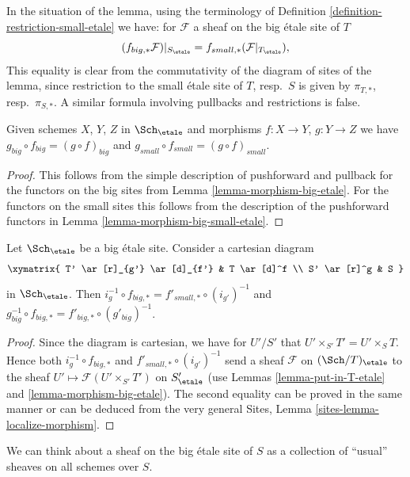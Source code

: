 \noindent
In the situation of the lemma, using the terminology of
Definition \ref{definition-restriction-small-etale}
we have: for $\mathcal{F}$ a sheaf on the big \'etale site of $T$
$$
(f_{big, *}\mathcal{F})|_{S_\etale} =
f_{small, *}(\mathcal{F}|_{T_\etale}),
$$
This equality is clear from the commutativity of the diagram of
sites of the lemma, since restriction to the small \'etale site of
$T$, resp.\ $S$ is given by $\pi_{T, *}$, resp.\ $\pi_{S, *}$. A similar
formula involving pullbacks and restrictions is false.

\begin{lemma}
\label{lemma-composition-etale}
Given schemes $X$, $Y$, $Z$ in $\Sch_\etale$
and morphisms $f : X \to Y$, $g : Y \to Z$ we have
$g_{big} \circ f_{big} = (g \circ f)_{big}$ and
$g_{small} \circ f_{small} = (g \circ f)_{small}$.
\end{lemma}

\begin{proof}
This follows from the simple description of pushforward
and pullback for the functors on the big sites from
Lemma \ref{lemma-morphism-big-etale}. For the functors
on the small sites this follows from the description of
the pushforward functors in Lemma \ref{lemma-morphism-big-small-etale}.
\end{proof}

\begin{lemma}
\label{lemma-morphism-big-small-cartesian-diagram-etale}
Let $\Sch_\etale$ be a big \'etale site. Consider a cartesian diagram
$$
\xymatrix{
T' \ar[r]_{g'} \ar[d]_{f'} & T \ar[d]^f \\
S' \ar[r]^g & S
}
$$
in $\Sch_\etale$. Then
$i_g^{-1} \circ f_{big, *} = f'_{small, *} \circ (i_{g'})^{-1}$
and $g_{big}^{-1} \circ f_{big, *} = f'_{big, *} \circ (g'_{big})^{-1}$.
\end{lemma}

\begin{proof}
Since the diagram is cartesian, we have for $U'/S'$
that $U' \times_{S'} T' = U' \times_S T$. Hence both
$i_g^{-1} \circ f_{big, *}$ and $f'_{small, *} \circ (i_{g'})^{-1}$
send a sheaf $\mathcal{F}$ on $(\Sch/T)_\etale$ to the sheaf
$U' \mapsto \mathcal{F}(U' \times_{S'} T')$ on $S'_\etale$
(use Lemmas \ref{lemma-put-in-T-etale} and \ref{lemma-morphism-big-etale}).
The second equality can be proved in the same manner or can be
deduced from the very general
Sites, Lemma \ref{sites-lemma-localize-morphism}.
\end{proof}

\noindent
We can think about a sheaf on the big \'etale site of $S$ as a collection
of ``usual'' sheaves on all schemes over $S$.

